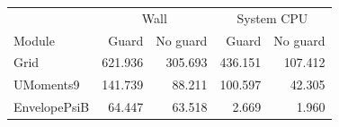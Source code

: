 \begin{tabular}{lrrrr}
\toprule
& \multicolumn{2}{c}{Wall} & \multicolumn{2}{c}{System CPU}\\
Module & Guard & No guard & Guard & No guard\\
\midrule
Grid & 621.936 & 305.693 & 436.151 & 107.412\\
UMoments9 & 141.739 & 88.211 & 100.597 & 42.305\\
EnvelopePsiB & 64.447 & 63.518 & 2.669 & 1.960\\
\bottomrule
\end{tabular}

